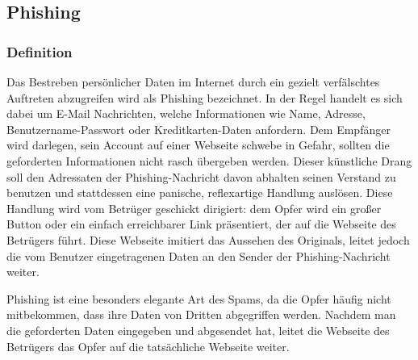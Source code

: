\subsection{Phishing} %
\label{sub:phishing}
\subsubsection{Definition} %
\label{ssub:definition}
Das Bestreben persönlicher Daten im Internet durch ein gezielt verfälschtes Auftreten abzugreifen wird als Phishing bezeichnet.
In der Regel handelt es sich dabei um E-Mail Nachrichten, welche Informationen wie Name, Adresse, Benutzername-Passwort oder Kreditkarten-Daten anfordern.
Dem Empfänger wird darlegen, sein Account auf einer Webseite schwebe in Gefahr, sollten die geforderten Informationen nicht rasch übergeben werden.
Dieser künstliche Drang soll den Adressaten der Phishing-Nachricht davon abhalten seinen Verstand zu benutzen und stattdessen eine panische, reflexartige Handlung auslösen.
Diese Handlung wird vom Betrüger geschickt dirigiert: dem Opfer wird ein großer Button oder ein einfach erreichbarer Link präsentiert, der auf die Webseite des Betrügers führt.
Diese Webseite imitiert das Aussehen des Originals, leitet jedoch die vom Benutzer eingetragenen Daten an den Sender der Phishing-Nachricht weiter.

Phishing ist eine besonders elegante Art des Spams, da die Opfer häufig nicht mitbekommen, dass ihre Daten von Dritten abgegriffen werden.
Nachdem man die geforderten Daten eingegeben und abgesendet hat, leitet die Webseite des Betrügers das Opfer auf die tatsächliche Webseite weiter.
